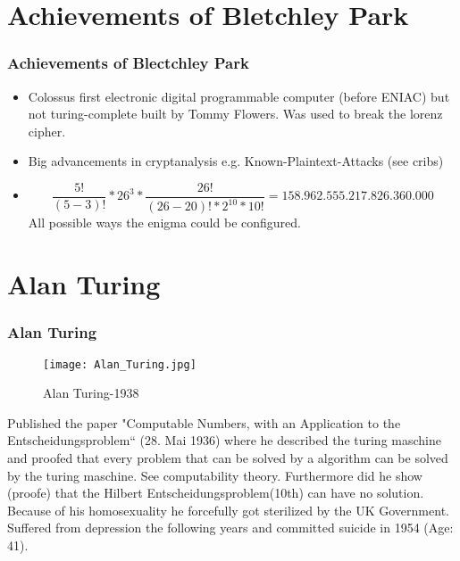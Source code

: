 \documentclass[10pt,]{beamer}
\begin{document}
\section{ Achievements of Bletchley Park }
\begin{frame}[fragile] %
  	\frametitle{Achievements of Blectchley Park} %
  	
  	\begin{itemize}
  		\item	Colossus first electronic digital programmable computer (before ENIAC) but not turing-complete built by Tommy Flowers. Was used to break the lorenz cipher.
  		\item Big advancements in cryptanalysis e.g. Known-Plaintext-Attacks (see cribs)
		\item 	\begin{equation}
				\frac{5!}{(5-3)!} * 26^3 * \frac{26!}{(26-20)! * 2 ^ {10} * 10! } = 158.962.555.217.826.360.000
				\end{equation}
				All possible ways the enigma could be configured.
  	\end{itemize}

\end{frame}

\section{ Alan Turing }
\begin{frame}[fragile] %
  	\frametitle{Alan Turing} %
	\begin{wrapfigure}{r}{}
    	\texttt{[image: Alan\_Turing.jpg]}
    	\caption{Alan Turing-1938}
    	\label{fig:alan_turing}
	\end{wrapfigure}		
	Published the paper "Computable Numbers, with an Application to the Entscheidungsproblem“ (28. Mai 1936) where he described the turing maschine and proofed that every problem that can be solved by a algorithm can be solved by the turing maschine. See computability theory. Furthermore did he show (proofe) that the Hilbert Entscheidungsproblem(10th) can have no solution.	\newline \newline
	Because of his homosexuality he forcefully got sterilized by the UK Government. Suffered from depression the following years and committed suicide in 1954 (Age: 41).
  	
\end{frame}
\end{document}
